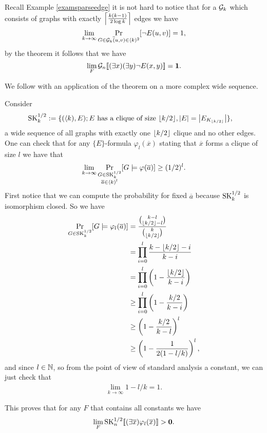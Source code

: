 \begin{exam}
Recall Example \ref{examsparseedge} it is not hard to notice that for a $\mathcal{G}_k$ which consists of graphs with exactly $\left \lceil {\frac{k(k-1)}{2\log k}} \right \rceil$ edges we have
\[\lim_{k\to\infty}\Pr_{\substack{G\in \mathcal{G}_k}\\\overline (u,v) \in \langle k)^2}[\lnot E(u,v)]=1,\]
by the theorem it follows that we have
\[\lim_{F}\mathcal{G}_n[\![(\exists x)(\exists y)\lnot E(x,y)]\!]=\textbf{1}.\]
\end{exam}

We follow with an application of the theorem on a more complex wide sequence.

\begin{exam}\label{examskhalf}
Consider
\begin{align*}
\text{SK}_k^{1/2}&:=\{(\langle k),E);\text{$E$ has a clique of size $\left \lfloor {k/2} \right \rfloor$}, \left|{E}\right|=\left|{E_{K_{\left \lfloor {k/2} \right \rfloor}}}\right|\},
\end{align*}
a wide sequence of all graphs with exactly one $\left \lfloor {k/2} \right \rfloor$ clique and no other edges. One can check that for any $\{E\}$-formula $\varphi_l(\overline x)$ stating that $\overline x$ forms a clique of size $l$ we have that 
\[\lim_{k\to\infty} \Pr_{\substack{G\in\text{SK}_k^{1/2}\\\overline a \in \langle k)^l}}[G\models \varphi(\overline a)]\geq(1/2)^l.\]
First notice that we can compute the probability for fixed $\overline a$ because $\text{SK}_k^{1/2}$ is isomorphism closed. So we have
\begin{align}
\Pr_{G\in\text{SK}_k^{1/2}}[G\models \varphi_l(\overline a)]&=\frac{\binom{k-l}{\left \lfloor {k/2} \right \rfloor-l}}{\binom{k}{\left \lfloor {k/2} \right \rfloor}}\\
&=\prod_{i=0}^l\frac{k-\left \lfloor {k/2} \right \rfloor-i}{k-i}\\
&=\prod_{i=0}^l\left(1-\frac{\left \lfloor {k/2} \right \rfloor}{k-i}\right)\\
&\geq\prod_{i=0}^l\left(1-\frac{k/2}{k-i}\right)\\
&\geq\left(1-\frac{k/2}{k-l}\right)^l\\
&\geq\left(1-\frac{1}{2(1-l/k)}\right)^l,
\end{align}
and since $l\in \mathbb{N}$, so from the point of view of standard analysis a constant, we can just check that
\begin{align}
\lim_{k\to\infty}1-l/k=1.
\end{align}

This proves that for any $F$ that contains all constants we have
\[\lim_{F}\text{SK}_{n}^{1/2}[\![(\exists \overline x)\varphi_l(\overline x)]\!]>\textbf{0}.\]
\end{exam}

